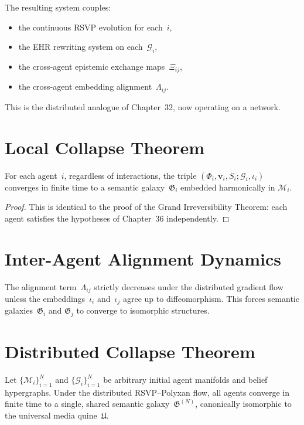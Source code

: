The resulting system couples:
\begin{itemize}
\item the continuous RSVP evolution for each~$i$,
\item the EHR rewriting system on each~$\mathcal{G}_i$,
\item the cross-agent epistemic exchange maps~$\Xi_{ij}$,
\item the cross-agent embedding alignment~$\Lambda_{ij}$.
\end{itemize}

This is the distributed analogue of Chapter~32, now operating on a network.

\section{Local Collapse Theorem}

\begin{theorem}
\label{thm:local-epistemic-collapse}
For each agent~$i$, regardless of interactions, the triple
$(\Phi_i, \mathbf{v}_i, S_i; \mathcal{G}_i, \iota_i)$ converges in finite
time to a semantic galaxy~$\mathfrak{G}_i$ embedded harmonically in
$\mathcal{M}_i$.
\end{theorem}

\begin{proof}
This is identical to the proof of the Grand Irreversibility Theorem:
each agent satisfies the hypotheses of Chapter~36 independently.
\end{proof}

\section{Inter-Agent Alignment Dynamics}

The alignment term~$\Lambda_{ij}$ strictly decreases under the distributed
gradient flow unless the embeddings~$\iota_i$ and~$\iota_j$ agree up to
diffeomorphism.  This forces semantic galaxies~$\mathfrak{G}_i$ and
$\mathfrak{G}_j$ to converge to isomorphic structures.

\section{Distributed Collapse Theorem}

\begin{theorem}
\label{thm:distributed-collapse}
Let $\{\mathcal{M}_i\}_{i=1}^N$ and $\{\mathcal{G}_i\}_{i=1}^N$ be arbitrary
initial agent manifolds and belief hypergraphs.  
Under the distributed RSVP--Polyxan flow, all agents converge in finite
time to a single, shared semantic galaxy~$\mathfrak{G}^{(N)}$, canonically
isomorphic to the universal media quine~$\mathfrak{U}$.
\end{theorem}

